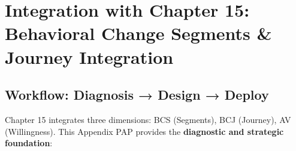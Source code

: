 \documentclass[11pt, a4paper]{article}
\begin{document}

\section{Integration with Chapter 15: Behavioral Change Segments \& Journey Integration}

\subsection{Workflow: Diagnosis → Design → Deploy}

Chapter 15 integrates three dimensions: BCS (Segments), BCJ (Journey), AV (Willingness).
This Appendix PAP provides the \textbf{diagnostic and strategic foundation}:
\end{document}
